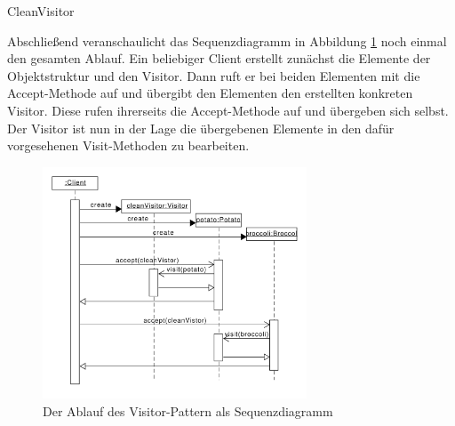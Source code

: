 \begin{listing}[h!]
   \centering
   \caption{CleanVisitor}
    \label{visitor_cleanvisitor}
\end{listing}  

Abschließend veranschaulicht das Sequenzdiagramm in Abbildung \ref{visitor_sequenzdiagramm}  noch einmal den gesamten Ablauf. Ein beliebiger Client erstellt zunächst die Elemente der Objektstruktur und den Visitor. Dann ruft er bei beiden Elementen mit die Accept-Methode auf und übergibt den Elementen den erstellten konkreten Visitor. Diese rufen ihrerseits die Accept-Methode auf und übergeben sich selbst. Der Visitor ist nun in der Lage die übergebenen Elemente in den dafür vorgesehenen Visit-Methoden zu bearbeiten.


\begin{figure}[htbp]
\centering
\includegraphics[width=0.7\textwidth]{./paper/visitor/visitor_sequenz}
\caption{Der Ablauf des Visitor-Pattern als Sequenzdiagramm}
\label{visitor_sequenzdiagramm}
\end{figure} 





